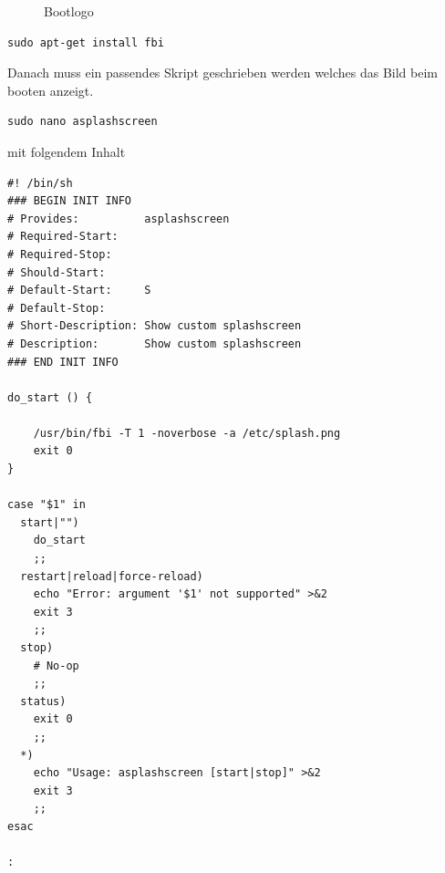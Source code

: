 \documentclass[11pt,a4paper]{article} %
\begin{document}
\begin{figure}[h]
	\caption{Bootlogo}
	\end{figure}

\begin{frame}

\begin{lstlisting}
sudo apt-get install fbi
\end{lstlisting}

\end{frame}

Danach muss ein passendes Skript geschrieben werden welches das Bild beim booten anzeigt.
\begin{frame}

\begin{lstlisting}
sudo nano asplashscreen
\end{lstlisting}

\end{frame}
\newpage
mit folgendem Inhalt
\begin{frame}

\begin{lstlisting}
#! /bin/sh
### BEGIN INIT INFO
# Provides:          asplashscreen
# Required-Start:
# Required-Stop:
# Should-Start:      
# Default-Start:     S
# Default-Stop:
# Short-Description: Show custom splashscreen
# Description:       Show custom splashscreen
### END INIT INFO
 
do_start () {
 
    /usr/bin/fbi -T 1 -noverbose -a /etc/splash.png    
    exit 0
}
 
case "$1" in
  start|"")
    do_start
    ;;
  restart|reload|force-reload)
    echo "Error: argument '$1' not supported" >&2
    exit 3
    ;;
  stop)
    # No-op
    ;;
  status)
    exit 0
    ;;
  *)
    echo "Usage: asplashscreen [start|stop]" >&2
    exit 3
    ;;
esac
 
:
\end{lstlisting}

\end{frame}
\end{document}
